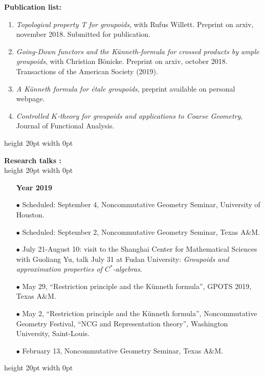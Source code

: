 \documentclass[a4paper,11pt]{article}
\newcommand\espace{\vrule height 20pt width 0pt}
\begin{document}
\textbf{Publication list:} 
\begin{enumerate}
\item \textit{Topological property T for groupoids}, with Rufus Willett. Preprint on arxiv, november 2018. Submitted for publication.
\item \textit{Going-Down functors and the Künneth-formula for crossed products by ample groupoids}, with Christian Bönicke. Preprint on arxiv, october 2018. Transactions of the American Society (2019).
\item \textit{A K\"{u}nneth formula for \'etale groupoids}, preprint available on personal webpage.
\item \textit{Controlled $K$-theory for groupoids and applications to Coarse Geometry}, Journal of Functional Analysis. 
\end{enumerate}
\espace

\textbf{Research talks :}\\
\espace
\begin{itemize}
\item[\textbf{Year 2019}]
\item[$\bullet$] Scheduled: September 4, Noncommutative Geometry Seminar, University of Houston.
\item[$\bullet$] Scheduled: September 2, Noncommutative Geometry Seminar, Texas A\&M.
\item[$\bullet$] July 21-August 10: visit to the Shanghai Center for Mathematical Sciences with Guoliang Yu, talk July 31 at Fudan University: \textit{Groupoids and approximation properties of $C^*$-algebras}. 
\item[$\bullet$] May 29, ``Restriction principle and the Künneth formula'', GPOTS 2019, Texas A\&M.
\item[$\bullet$] May 2, ``Restriction principle and the Künneth formula'', Noncommutative Geometry Festival, ``NCG and Representation theory'', Washington University, Saint-Louis.
\item[$\bullet$] February 13, Noncommutative Geometry Seminar, Texas A\&M.
\end{itemize}
\espace
\end{document}
